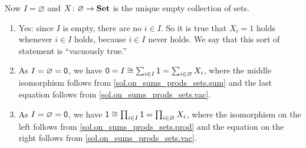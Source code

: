 \documentclass[Book-Poly]{subfiles}
\begin{document}
\begin{exercise}
\begin{solution}
\begin{enumerate}
\end{enumerate}
Now $I = \varnothing$ and $X \colon \varnothing \to \textbf{Set}$ is the unique empty collection of sets.
\begin{enumerate}[resume]
    \item \label{sol.on_sums_prods_sets.vac} Yes: since $I$ is empty, there are no $i \in I$.
    So it is true that $X_i = 1$ holds whenever $i \in I$ holds, because $i \in I$ never holds. 
    We say that this sort of statement is ``vacuously true.''
    
    \item As $I = \varnothing = \textsf{0}$, we have $\textsf{0} = I \cong \sum_{i \in I} \textsf{1} = \sum_{i \in \varnothing} X_i$, where the middle isomorphism follows from \cref{sol.on_sums_prods_sets.sum} and the last equation follows from \cref{sol.on_sums_prods_sets.vac}.
    
    \item As $I = \varnothing = \textsf{0}$, we have $\textsf{1} \cong \prod_{i \in I} \textsf{1} = \prod_{i \in \varnothing} X_i$, where the isomorphism on the left follows from \cref{sol.on_sums_prods_sets.prod} and the equation on the right follows from \cref{sol.on_sums_prods_sets.vac}.
\end{enumerate}
\end{solution}
\end{exercise}
\end{document}
